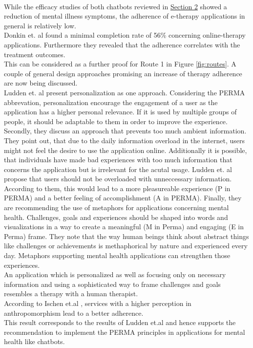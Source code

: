 \documentclass[sigconf, nonacm]{acmart}
\begin{document}
\\
While the efficacy studies of both chatbots reviewed in \hyperref[sec:two]{Section 2} showed a reduction of mental illness symptoms, the adherence of e-therapy applications in general is relatively low.
\\
Donkin et. al \cite{Donkin} found a minimal completion rate of 56\% concerning online-therapy applications. Furthermore they revealed that the adherence correlates with the treatment outcomes.\cite{Donkin, Donkin2011}
\\This can be considered as a further proof for Route 1 in Figure \ref{fig:routes}.  
A couple of general design approaches promising an increase of therapy adherence are now being discussed.
\\
Ludden et. al \cite{Ludden2015} present personalization as one approach. Considering the PERMA abbrevation, personalization encourage the engagement of a user as the application has a higher personal relevance. If it is used by multiple groups of people, it should be adaptable to them in order to improve the experience.
Secondly, they discuss an approach that prevents too much ambient information. They point out, that due to the daily information overload in the internet, users might not feel the desire to use the
application online. Additionally it is possible, that individuals have made bad experiences with too much information that concerns the application but is irrelevant for the acutal usage. 
Ludden et. al propose that users should not be overloaded with unneccessary information. According to them, this would lead to a more pleasureable experience (P in PERMA) and a better feeling of accomplishment (A in PERMA).
Finally, they are recommending the use of metaphors for applications concerning mental health. Challenges, goals and experiences should be shaped into words and visualizations in a way to create a meaningful (M in Perma) and engaging (E in Perma) frame.
They note that the way human beings think about abstract things like challenges or achievements is methaphorical by nature and experienced every day. Metaphors supporting mental health applications can strengthen those experiences.
\\
An application which is personalized as well as focusing only on necessary information and using a sophisticated way to frame challenges and goals resembles a therapy with a human therapist.
\\
According to Ischen et.al \cite{Ischen}, services with a higher perception in anthropomorphism lead to a better adherence.
\\
This result corresponds to the results of Ludden et.al and hence supports the recommendation to implement the PERMA principles in applications for mental health like chatbots. 
\\
\end{document}
